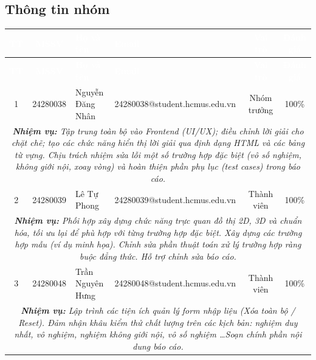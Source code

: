 \documentclass[12pt,a4paper]{article}
\begin{document}
\subsection{Thông tin nhóm}
{\centering
    \small
    \setlength{\extrarowheight}{1pt}
    \begin{longtable}{|c|c|l|l|c|c|}
        \hline
        \rowcolor{primary}
        \textcolor{white}{\textbf{TT}} &
        \textcolor{white}{\textbf{MSSV}} &
        \textcolor{white}{\textbf{Họ và tên}} &
        \textcolor{white}{\textbf{Email}} &
        \textcolor{white}{\textbf{Vai trò}} &
        \textcolor{white}{\textbf{Đánh giá}} \\ \hline
        \endfirsthead
        \hline
        \rowcolor{primary}
        \textcolor{white}{\textbf{TT}} &
        \textcolor{white}{\textbf{MSSV}} &
        \textcolor{white}{\textbf{Họ và tên}} &
        \textcolor{white}{\textbf{Email}} &
        \textcolor{white}{\textbf{Vai trò}} &
        \textcolor{white}{\textbf{Đánh giá}} \\ \hline
        \endhead

        1 & 24280038 & Nguyễn Đăng Nhân
          & {\footnotesize 24280038@student.hcmus.edu.vn}
          & Nhóm trưởng & 100\%\\ \hline
        \multicolumn{6}{|p{\dimexpr\textwidth-2\tabcolsep-2\arrayrulewidth\relax}|}{%
        \cellcolor{blue!5}\textit{\textbf{Nhiệm vụ:} Tập trung toàn bộ vào Frontend (UI/UX); điều chỉnh lời giải cho chặt chẽ; tạo các chức năng hiển thị lời giải qua định dạng HTML và các bảng từ vựng. Chịu trách nhiệm sửa lỗi một số trường hợp đặc biệt (vô số nghiệm, không giới nội, xoay vòng) và hoàn thiện phần phụ lục (test cases) trong báo cáo.}} \\ \hline

        2 & 24280039 & Lê Tự Phong
          & {\footnotesize 24280039@student.hcmus.edu.vn}
          & Thành viên & 100\% \\ \hline
        \multicolumn{6}{|p{\dimexpr\textwidth-2\tabcolsep-2\arrayrulewidth\relax}|}{%
        \cellcolor{blue!5}\textit{\textbf{Nhiệm vụ:} Phối hợp xây dựng chức năng trực quan đồ thị 2D, 3D và chuẩn hóa, tối ưu lại để phù hợp với từng trường hợp đặc biệt. Xây dựng các trường hợp mẫu (ví dụ minh họa). Chỉnh sửa phần thuật toán xử lý trường hợp ràng buộc đẳng thức. Hỗ trợ chỉnh sửa báo cáo.}} \\ \hline

        3 & 24280048 & Trần Nguyên Hưng
          & {\footnotesize 24280048@student.hcmus.edu.vn}
          & Thành viên & 100\%\\ \hline
        \multicolumn{6}{|p{\dimexpr\textwidth-2\tabcolsep-2\arrayrulewidth\relax}|}{%
        \cellcolor{blue!5}\textit{\textbf{Nhiệm vụ:} Lập trình các tiện ích quản lý form nhập liệu (Xóa toàn bộ / Reset). Đảm nhận khâu kiểm thử chất lượng trên các kịch bản: nghiệm duy nhất, vô nghiệm, nghiệm không giới nội, vô số nghiệm \ldots Soạn chính phần nội dung báo cáo.}} \\ \hline


\end{longtable}}
\end{document}
